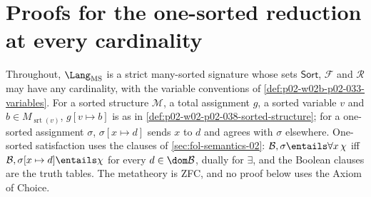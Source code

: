 \section{Proofs for the one-sorted reduction at every cardinality}
\label{sec:annex-p02-w02b-p02-033-any-cardinality}

Throughout, \(\Lang_{\mathrm{MS}}\) is a strict many-sorted signature whose
sets \(\mathsf{Sort}\), \(\mathcal F\) and \(\mathcal R\) may have any
cardinality, with the variable conventions of
\cref{def:p02-w02b-p02-033-variables}.  For a sorted structure
\(\mathcal M\), a total assignment \(g\), a sorted variable \(v\) and
\(b\in M_{\operatorname{srt}(v)}\), \(g[v\mapsto b]\) is as in
\cref{def:p02-w02-p02-038-sorted-structure}; for a one-sorted assignment
\(\sigma\), \(\sigma[x\mapsto d]\) sends \(x\) to \(d\) and agrees with
\(\sigma\) elsewhere.  One-sorted satisfaction uses the clauses of
\cref{sec:fol-semantics-02}: \(\mathcal B,\sigma\entails\forall x\,\chi\) iff
\(\mathcal B,\sigma[x\mapsto d]\entails\chi\) for every \(d\in\dom\mathcal B\),
dually for \(\exists\), and the Boolean clauses are the truth tables.  The
metatheory is ZFC, and no proof below uses the Axiom of Choice.

